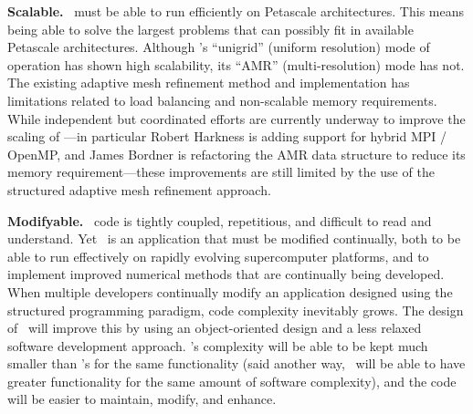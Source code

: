 \documentclass[11pt]{article}
\begin{document}

    \textbf{Scalable.} \cello\ must be able to run efficiently on
    Petascale architectures.  This means being able to solve the
    largest problems that can possibly fit in available Petascale
    architectures.  Although \enzo's ``unigrid'' (uniform resolution)
    mode of operation has shown high scalability, its ``AMR''
    (multi-resolution) mode has not.  The existing adaptive mesh
    refinement method and implementation has limitations related to
    load balancing and non-scalable memory requirements.  While
    independent but coordinated efforts are currently underway to
    improve the scaling of \enzo---in particular Robert Harkness is
    adding support for hybrid MPI / OpenMP, and James Bordner is
    refactoring the AMR data structure to reduce its memory
    requirement---these improvements are still limited by the use of
    the structured adaptive mesh refinement approach.


    \textbf{Modifyable.} \enzo\ code is tightly coupled, repetitious,
    and difficult to read and understand.  Yet \enzo\ is an
    application that must be modified continually, both to be able to
    run effectively on rapidly evolving supercomputer platforms, and
    to implement improved numerical methods that are continually being
    developed.  When multiple developers continually modify an
    application designed using the structured programming paradigm,
    code complexity inevitably grows.  The design of \cello\ will
    improve this by using an object-oriented design and a less relaxed
    software development approach.  \cello's complexity will be able
    to be kept much smaller than \enzo's for the same functionality
    (said another way, \cello\ will be able to have greater
    functionality for the same amount of software complexity), and the
    code will be easier to maintain, modify, and enhance.

\end{document}

